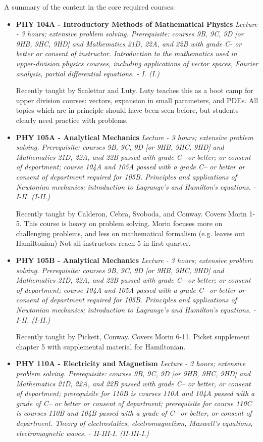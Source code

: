\documentclass[12pt]{article}
\begin{document}
A summary of the content in the core required courses:
\begin{itemize}
\item {\bf PHY 104A - Introductory Methods of Mathematical Physics}
{\it Lecture - 3 hours; extensive problem solving. Prerequisite: courses 9B, 9C, 9D [or 9HB, 9HC, 9HD] and Mathematics 21D, 22A, and 22B with grade C- or better or consent of instructor. Introduction to the mathematics used in upper-division physics courses, including applications of vector spaces, Fourier analysis, partial differential equations. - I. (I.)}

Recently taught by Scalettar and Luty.  Luty teaches this as a boot camp for upper division courses:  vectors, expansion in small parameters, and PDEs.  All topics which are in principle should have been seen before, but students clearly need practice with problems.

\item {\bf PHY 105A - Analytical Mechanics}
{\it Lecture - 3 hours; extensive problem solving. Prerequisite: courses 9B, 9C, 9D [or 9HB, 9HC, 9HD] and Mathematics 21D, 22A, and 22B passed with grade C– or better; or consent of department; course 104A and 105A passed with a grade C– or better or consent of department required for 105B. Principles and applications of Newtonian mechanics; introduction to Lagrange’s and Hamilton’s equations. - I-II. (I-II.)}

Recently taught by Calderon, Cebra, Svoboda, and Conway.  Covers Morin 1-5.  This course is heavy on problem solving.  Morin focuses more on challenging problems, and less on mathematical formalism (e.g. leaves out Hamiltonian)
Not all instructors reach 5 in first quarter.

\item {\bf PHY 105B - Analytical Mechanics}
{\it Lecture - 3 hours; extensive problem solving. Prerequisite: courses 9B, 9C, 9D [or 9HB, 9HC, 9HD] and Mathematics 21D, 22A, and 22B passed with grade C– or better; or consent of department; course 104A and 105A passed with a grade C– or better or consent of department required for 105B. Principles and applications of Newtonian mechanics; introduction to Lagrange’s and Hamilton’s equations. - I-II. (I-II.)}

Recently taught by Pickett, Conway.  Covers Morin 6-11.  Picket supplement chapter 5 with supplemental material for Hamiltonian.

\item {\bf PHY 110A - Electricity and Magnetism}
{\it Lecture - 3 hours; extensive problem solving. Prerequisite: courses 9B, 9C, 9D [or 9HB, 9HC, 9HD] and Mathematics 21D, 22A, and 22B passed with grade C– or better, or consent of department; prerequisite for 110B is courses 110A and 104A passed with a grade of C– or better or consent of department; prerequisite for course 110C is courses 110B and 104B passed with a grade of C– or better, or consent of department. Theory of electrostatics, electromagnetism, Maxwell’s equations, electromagnetic waves. - II-III-I. (II-III-I.)}


\end{itemize}
\end{document}
